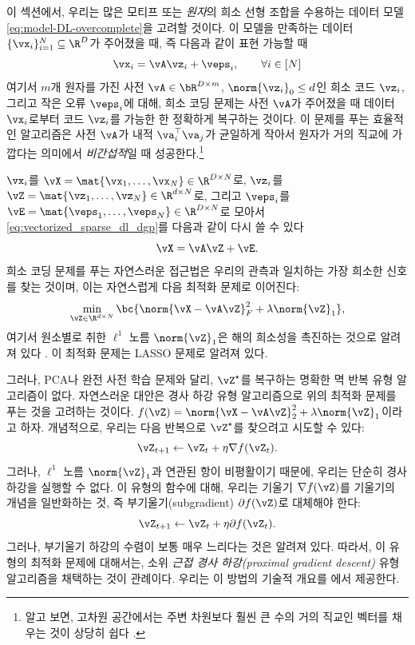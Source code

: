 \documentclass[../../book-main_ko.tex]{subfiles}
\begin{document}
이 섹션에서, 우리는 많은 모티프 또는 \textit{원자}의 희소 선형 조합을 수용하는 데이터 모델 \eqref{eq:model-DL-overcomplete}을 고려할 것이다. 이 모델을 만족하는 데이터 \(\{\vx_{i}\}_{i = 1}^{N} \subseteq \R^{D}\)가 주어졌을 때, 즉 다음과 같이 표현 가능할 때
\begin{equation}\label{eq:vectorized_sparse_dl_dgp}
    \vx_{i} = \vA\vz_{i} + \veps_{i}, \qquad \forall i \in [N]
\end{equation}
여기서 \(m\)개 원자를 가진 사전 \(\vA \in \bR^{D \times m}\), \(\norm{\vz_i}_0 \leq d\)인 희소 코드 \(\vz_i\), 그리고 작은 오류 \(\veps_i\)에 대해, 희소 코딩 문제는 사전 \(\vA\)가 주어졌을 때 데이터 \(\vx_i\)로부터 코드 \(\vz_i\)를 가능한 한 정확하게 복구하는 것이다.
이 문제를 푸는 효율적인 알고리즘은 사전 \(\vA\)가 내적 \(\va_{i}^{\top}\va_{j}\)가 균일하게 작아서 원자가 거의 직교에 가깝다는 의미에서 \textit{비간섭적}일 때 성공한다.\footnote{알고 보면, 고차원 공간에서는 주변 차원보다 훨씬 큰 수의 거의 직교인 벡터를 채우는 것이 상당히 쉽다 \cite{Wright-Ma-2022}.}


\(\vx_{i}\)를 \(\vX = \mat{\vx_{1}, \dots, \vx_{N}} \in \R^{D \times N}\)로, \(\vz_{i}\)를 \(\vZ = \mat{\vz_{1}, \dots, \vz_{N}} \in \R^{d  \times N}\)로, 그리고 \(\veps_{i}\)를 \(\vE = \mat{\veps_{1}, \dots, \veps_{N}} \in \R^{D \times N}\)로 모아서 \eqref{eq:vectorized_sparse_dl_dgp}를 다음과 같이 다시 쓸 수 있다
\begin{equation}\label{eq:sparse_dl_dgp}
    \vX = \vA\vZ + \vE.
\end{equation}
희소 코딩 문제를 푸는 자연스러운 접근법은 우리의 관측과 일치하는 가장 희소한 신호를 찾는 것이며, 이는 자연스럽게 다음 최적화 문제로 이어진다:
\begin{equation}\label{eq:sparse_dl_lasso}
    \min_{\vZ \in \R^{d \times N}}\bc{\norm{\vX - \vA\vZ}_{F}^{2} + \lambda \norm{\vZ}_{1}},
\end{equation}
여기서 원소별로 취한 \(\ell^1\) 노름 \(\norm{\vZ}_{1}\)은 해의 희소성을 촉진하는 것으로 알려져 있다 \cite{Wright-Ma-2022}.
이 최적화 문제는 LASSO 문제로 알려져 있다.

그러나, PCA나 완전 사전 학습 문제와 달리, \(\vZ^{\star}\)를 복구하는 명확한 멱 반복 유형 알고리즘이 없다. 자연스러운 대안은 경사 하강 유형 알고리즘으로 위의 최적화 문제를 푸는 것을 고려하는 것이다.
\(f(\vZ) = \norm{\vX - \vA\vZ}_{2}^{2} + \lambda \norm{\vZ}_{1}\)이라고 하자.
개념적으로, 우리는 다음 반복으로 \(\vZ^{\star}\)를 찾으려고 시도할 수 있다:
\begin{equation}
    \vZ_{t+1} \leftarrow \vZ_t + \eta \nabla f(\vZ_t).
\end{equation}
그러나, \(\ell^1\) 노름 \(\norm{\vZ}_{1}\)과 연관된 항이 비평활이기 때문에, 우리는 단순히 경사 하강을 실행할 수 없다. 이 유형의 함수에 대해, 우리는 기울기 \(\nabla f(\vZ)\)를 기울기의 개념을 일반화하는 것, 즉 부기울기(subgradient) \(\partial f(\vZ)\)로 대체해야 한다:
\begin{equation}
    \vZ_{t+1} \leftarrow \vZ_t + \eta \partial f(\vZ_t).
\end{equation}
그러나, 부기울기 하강의 수렴이 보통 매우 느리다는 것은 알려져 있다. 따라서, 이 유형의 최적화 문제에 대해서는, 소위 {\em 근접 경사 하강(proximal gradient descent)} 유형 알고리즘을 채택하는 것이 관례이다. 우리는 이 방법의 기술적 개요를 에서 제공한다.
\end{document}

